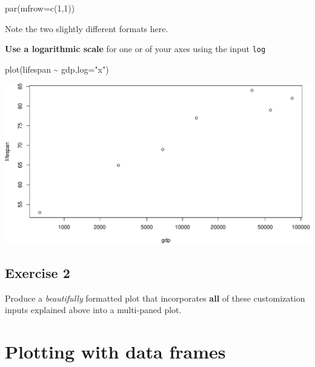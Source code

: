 \documentclass[
]{book}
\newenvironment{Shaded}{\begin{snugshade}}{\end{snugshade}}
\newcommand{\AttributeTok}[1]{\textcolor[rgb]{0.77,0.63,0.00}{#1}}
\newcommand{\DecValTok}[1]{\textcolor[rgb]{0.00,0.00,0.81}{#1}}
\newcommand{\FunctionTok}[1]{\textcolor[rgb]{0.00,0.00,0.00}{#1}}
\newcommand{\NormalTok}[1]{#1}
\newcommand{\SpecialCharTok}[1]{\textcolor[rgb]{0.00,0.00,0.00}{#1}}
\newcommand{\StringTok}[1]{\textcolor[rgb]{0.31,0.60,0.02}{#1}}
\begin{document}
\begin{Shaded}
\begin{Highlighting}[]
\FunctionTok{par}\NormalTok{(}\AttributeTok{mfrow=}\FunctionTok{c}\NormalTok{(}\DecValTok{1}\NormalTok{,}\DecValTok{1}\NormalTok{))}
\end{Highlighting}
\end{Shaded}

Note the two slightly different formats here.

\textbf{Use a logarithmic scale} for one or of your axes using the input \texttt{log}

\begin{Shaded}
\begin{Highlighting}[]
\FunctionTok{plot}\NormalTok{(lifespan }\SpecialCharTok{\textasciitilde{}}\NormalTok{ gdp,}\AttributeTok{log=}\StringTok{"x"}\NormalTok{)}
\end{Highlighting}
\end{Shaded}

\includegraphics{figures/unnamed-chunk-113-1.pdf}

\hypertarget{exercise-2-4}{%
\subsection*{Exercise 2}\label{exercise-2-4}}

Produce a \emph{beautifully} formatted plot that incorporates \textbf{all} of these customization inputs explained above into a multi-paned plot.

\hypertarget{plotting-with-data-frames}{%
\section*{Plotting with data frames}\label{plotting-with-data-frames}}
\end{document}
